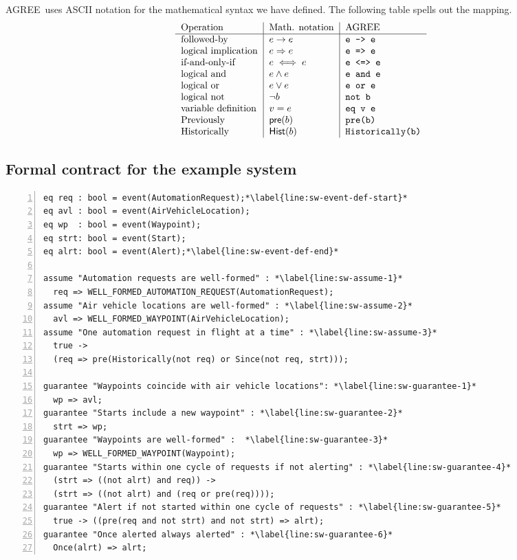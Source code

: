 \documentclass[global,twocolumn]{svjour}
\newcommand{\konst}[1]{\ensuremath{\mathsf{#1}}}
\newcommand{\imp}{\Rightarrow}
\newcommand{\agr}{AGREE}
\begin{document}
\agr\ uses ASCII notation for the mathematical syntax we have defined.
%
The following table spells out the mapping.
%
\[
\begin{tabular}{l|l|l}
 Operation & Math. notation & \agr \\ \hline
 followed-by &  $e \to e$          & \verb+e -> e+  \\
 logical implication &  $e \imp e$ & \verb+e => e+ \\
 if-and-only-if &  $e \iff e$      & \verb+e <=> e+ \\
 logical and &  $e \land e$      & \verb+e and e+ \\
 logical or &  $e \lor e$      & \verb+e or e+ \\
 logical not & $\neg b$      & \verb+not b+ \\
 variable definition & $v = e$     & \verb+eq v e+ \\
 Previously  & $\konst{pre}(b)$ & \verb+pre(b)+ \\
 Historically  & $\konst{Hist}(b)$ & \verb+Historically(b)+ \\
\end{tabular}
\]


\subsection{Formal contract for the example system}
\label{sec:sw-contract}

\newsavebox{\sw}
\begin{lrbox}{\sw}
\begin{lstlisting}[style=agree,numbers=left]
eq req : bool = event(AutomationRequest);*\label{line:sw-event-def-start}*
eq avl : bool = event(AirVehicleLocation);
eq wp  : bool = event(Waypoint);
eq strt: bool = event(Start);
eq alrt: bool = event(Alert);*\label{line:sw-event-def-end}*

assume "Automation requests are well-formed" : *\label{line:sw-assume-1}*
  req => WELL_FORMED_AUTOMATION_REQUEST(AutomationRequest);
assume "Air vehicle locations are well-formed" : *\label{line:sw-assume-2}*
  avl => WELL_FORMED_WAYPOINT(AirVehicleLocation);
assume "One automation request in flight at a time" : *\label{line:sw-assume-3}*
  true ->
  (req => pre(Historically(not req) or Since(not req, strt)));

guarantee "Waypoints coincide with air vehicle locations": *\label{line:sw-guarantee-1}*
  wp => avl;
guarantee "Starts include a new waypoint" : *\label{line:sw-guarantee-2}*
  strt => wp;
guarantee "Waypoints are well-formed" :  *\label{line:sw-guarantee-3}*
  wp => WELL_FORMED_WAYPOINT(Waypoint);
guarantee "Starts within one cycle of requests if not alerting" : *\label{line:sw-guarantee-4}*
  (strt => ((not alrt) and req)) ->
  (strt => ((not alrt) and (req or pre(req))));
guarantee "Alert if not started within one cycle of requests" : *\label{line:sw-guarantee-5}*
  true -> ((pre(req and not strt) and not strt) => alrt);
guarantee "Once alerted always alerted" : *\label{line:sw-guarantee-6}*
  Once(alrt) => alrt;
\end{lstlisting}
\end{lrbox}
\end{document}
